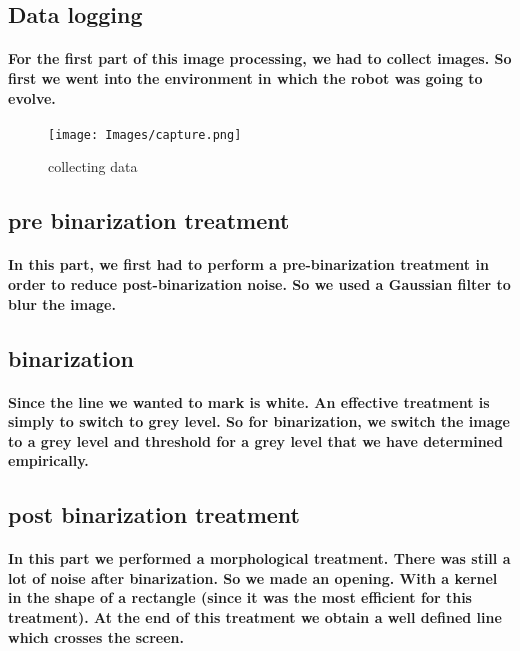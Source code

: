 \subsection{Data logging}
\paragraph{For the first part of this image processing, we had to collect images.
So first we went into the environment in which the robot was going to evolve.}
\begin{figure}[h!]
    \begin{center}
        \texttt{[image: Images/capture.png]}
    \end{center}
    \caption{collecting data}
    \label{fig:capture}
\end{figure}
\subsection{pre binarization treatment}
\paragraph{In this part, we first had to perform a pre-binarization treatment in order to reduce post-binarization noise.
So we used a Gaussian filter to blur the image. }

\subsection{binarization}
\paragraph{Since the line we wanted to mark is white. An effective treatment is simply to switch to grey level. 
So for binarization, we switch the image to a grey level and threshold for a grey level that we have determined empirically. }

\subsection{post binarization treatment}
\paragraph{In this part we performed a morphological treatment. There was still a lot of noise after binarization. So we made an opening. 
With a kernel in the shape of a rectangle (since it was the most efficient for this treatment).
At the end of this treatment we obtain a well defined line which crosses the screen. }

